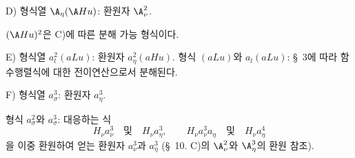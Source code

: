 
\noindent D) 형식열 $\A_\eta(\A Hu)$: 환원자 $\A_\nu^2$.

$(\A Hu)^2$은 C)에 따른 분해 가능 형식이다.

\noindent E) 형식열 $a_l^2(aLu)$: 환원자 $a_\eta^2(aHu)$.
형식 $(aLu)$와 $a_l(aLu)$: \S\ 3에 따라 함수행렬식에 대한 전이연산으로서 분해된다.

\noindent F) 형식열 $a_\sigma^3$: 환원자 $a_\eta^3$.

형식 $a_\sigma^2$와 $a_\sigma^3$: 대응하는 식
\[
H_\nu a_\nu^3\quad\text{및}\quad H_\nu a_\eta^3,
\qquad
H_\nu a_\nu^3a_\eta\quad\text{및}\quad H_\nu a_\eta^4
\]
을 이중 환원하여 얻는 환원자 $a_\nu^3$과 $a_\eta^3$ (\S\ 10. C)의 $\A_\nu^2$와 $\A_\eta^3$의 환원 참조).
